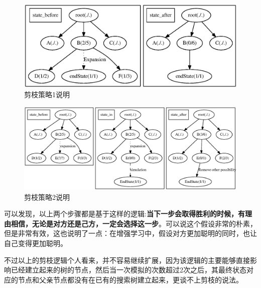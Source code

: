 \documentclass[9pt,twocolumn,twoside]{osajnl}
\begin{document}
\begin{adjustwidth}{2em}{}
	\begin{figure}[htbp]
		\centering
		\includegraphics[width=\linewidth]{policy1.eps}
		\caption{剪枝策略1说明}
		\label{fig:policy1}
	\end{figure}
	\begin{figure}[htbp]
		\centering
		\includegraphics[width=\linewidth]{policy2.eps}
		\caption{剪枝策略2说明}
		\label{fig:policy2}
	\end{figure}
	
	可以发现，以上两个步骤都是基于这样的逻辑:\textbf{当下一步会取得胜利的时候，有理由相信，无论是对方还是己方，一定会选择这一步}。可以说这个假设非常的朴素，但是非常有效，这也说明了一点：在增强学习中，假设对方更加聪明的同时，也让自己变得更加聪明。
	
	不过以上的剪枝逻辑个人看来，并不容易继续扩展，因为该逻辑的主要能够直接影响已经建立起来的树的节点，然后当一次模拟的次数超过2次之后，其最终状态对应的节点和父亲节点都没有在已有的搜索树建立起来，更谈不上剪枝的说法。
	
	
	
\end{adjustwidth}
\end{document}
